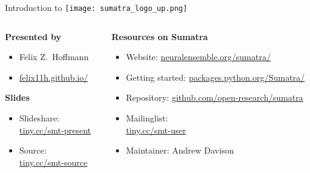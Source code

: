 \begin{frame}
  \begin{center} 
    \Large 
    Introduction to \texttt{[image: sumatra\_logo\_up.png]} 
  \end{center}
  
  \vspace{0.35cm}

  \begin{columns}[t]
    \begin{column}{0.4\textwidth}        
      \textbf{Presented by}
      \normalsize
      \vspace{0.18cm}
      \begin{itemize}[leftmargin=0.6cm]
        \item[] Felix Z.~Hoffmann
        \item[] \href{http://felix11h.github.io/}{felix11h.github.io/}
      \end{itemize}

      \vspace{0.38cm}
      \textbf{Slides}
      \normalsize
      \vspace{0.18cm}
      \begin{itemize}[leftmargin=0.6cm]
        \item[] Slideshare:\\ %
          \href{http://tiny.cc/smt-present}{tiny.cc/smt-present}
        \item[] Source:\\ %
          \href{http://tiny.cc/smt-source}{tiny.cc/smt-source}
      \end{itemize}
    \end{column}
    \begin{column}{0.64\textwidth}
      \textbf{Resources on Sumatra}
      \vspace{0.28cm}
      \normalsize 
      \begin{itemize}[leftmargin=0.6cm]
        \item[] Website: %
          \href{http://neuralensemble.org/sumatra/}{%
            neuralensemble.org/sumatra/}\\
        \item[]Getting started: %
          \href{http://packages.python.org/Sumatra/}{%
            packages.python.org/Sumatra/}\\
        \item[]Repository: %
          \href{https://github.com/open-research/sumatra}{%
            github.com/open-research/sumatra}
        \item[] Mailinglist: \\%
          \href{http://tiny.cc/smt-user}{tiny.cc/smt-user}
        \item[] Maintainer: Andrew Davison 
      \end{itemize}
    \end{column}
  \end{columns}


\end{frame}
